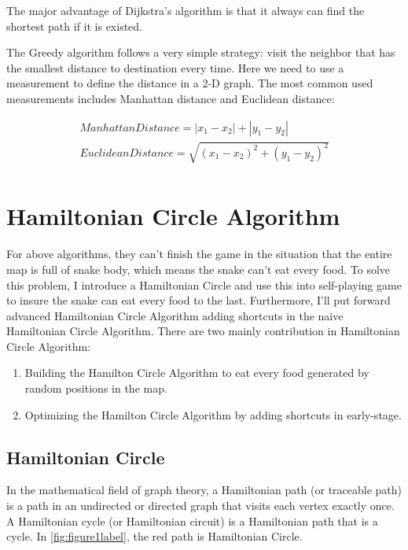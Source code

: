 \documentclass[12pt]{article}
\begin{document}
The major advantage of Dijkstra's algorithm is that it always can find the shortest path if it is existed.

The Greedy algorithm follows a very simple strategy: visit the neighbor that has the smallest distance to destination every time. Here we need to use a measurement to define the distance in a 2-D graph. The most common used measurements includes Manhattan distance and Euclidean distance:

\[\begin{aligned}
    Manhattan Distance = |x_1-x_2|+|y_1-y_2|\\
    Euclidean Distance = \sqrt{(x_1-x_2)^2+(y_1-y_2)^2}\\
\end{aligned}\]


\section{Hamiltonian Circle Algorithm}

For above algorithms, they can't finish the game in the situation that the entire map is full of snake body, which means the snake can't eat every food. To solve this problem, I introduce a Hamiltonian Circle and use this into self-playing game to insure the snake can eat every food to the last. Furthermore, I'll put forward advanced Hamiltonian Circle Algorithm adding shortcuts in the naive Hamiltonian Circle Algorithm. There are two mainly contribution in Hamiltonian Circle Algorithm:
\begin{enumerate}
    \item Building the Hamilton Circle Algorithm to eat every food generated by random positions in the map. 
    \item Optimizing the Hamilton Circle Algorithm by adding shortcuts in early-stage.
\end{enumerate}
    
\subsection{Hamiltonian Circle}
In the mathematical field of graph theory, a Hamiltonian path (or traceable path) is a path in an undirected or directed graph that visits each vertex exactly once. A Hamiltonian cycle (or Hamiltonian circuit) is a Hamiltonian path that is a cycle. In \ref{fig:figure1label}, the red path is Hamiltonian Circle. 
    
\end{document}
